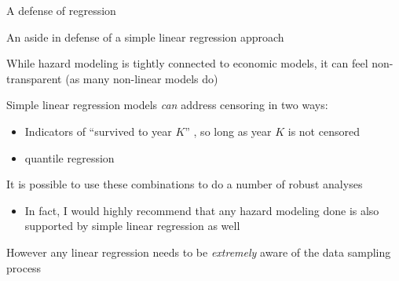 \documentclass[notes,11pt, aspectratio=169]{beamer}
\newenvironment{wideitemize}{\itemize\addtolength{\itemsep}{10pt}}{\enditemize}
\begin{document}
  \begin{frame}{A defense of regression}
    \begin{wideitemize}
    \item An aside in defense of a simple linear regression approach
    \item While hazard modeling is tightly connected to economic
      models, it can feel non-transparent (as many non-linear models
      do)
    \item Simple linear regression models \emph{can} address censoring in two ways:
      \begin{itemize}
      \item Indicators of ``survived to year $K$'' , so long as year
        $K$ is not censored
      \item quantile regression
      \end{itemize}
    \item It is possible to use these combinations to do a number of
      robust analyses
      \begin{itemize}
      \item In fact, I would highly recommend that any hazard modeling
        done is also supported by simple linear regression as well
      \end{itemize}
    \item However any linear regression needs to be \emph{extremely}
      aware of the data sampling process
    \end{wideitemize}
  \end{frame}
\end{document}
